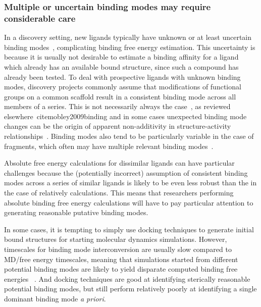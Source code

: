 \documentclass[9pt,bestpractices]{livecoms}
\begin{document}


\subsubsection{Multiple or uncertain binding modes may require considerable care}
\label{sec:multiple_binding_modes}

In a discovery setting, new ligands typically have unknown or at least uncertain binding modes~\cite{kaus2015how, plountprice2000analysis,mobley2009binding,calabro2016elucidation},  complicating binding free energy estimation.
This uncertainty is because it is usually not desirable to estimate a binding affinity for a ligand which already has an available bound structure, since such a compound has already been tested.
To deal with prospective ligands with unknown binding modes, discovery projects commonly assume that modifications of functional groups on a common scaffold result in a consistent binding mode across all members of a series.
This is not necessarily always the case~\cite{kaus2015how}, as reviewed elsewhere~cite{mobley2009binding} and in some cases unexpected binding mode changes can be the origin of apparent non-additivity in structure-activity relationships~\cite{calabro2016elucidation}.
Binding modes also tend to be particularly variable in the case of fragments, which often may have multiple relevant binding modes~\cite{}.

Absolute free energy calculations for dissimilar ligands can have particular challenges because the (potentially incorrect) assumption of consistent binding modes across a series of similar ligands is likely to be even less robust than the in the case of relatively calculations.
This means that researchers performing absolute binding free energy calculations will have to pay particular attention to generating reasonable putative binding modes.

In some cases, it is tempting to simply use docking techniques to generate initial bound structures for starting molecular dynamics simulations.
However, timescales for binding mode interconversion are usually slow compared to MD/free energy timescales, meaning that simulations started from different potential binding modes are likely to yield disparate computed binding free energies~\cite{mobley2006use, palma2012computation, mobley2012perspective, gill2018binding} .
And docking techniques are good at identifying sterically reasonable potential binding modes, but still perform relatively poorly at identifying a single dominant binding mode \emph{a priori}.~\cite{} 
\end{document}
